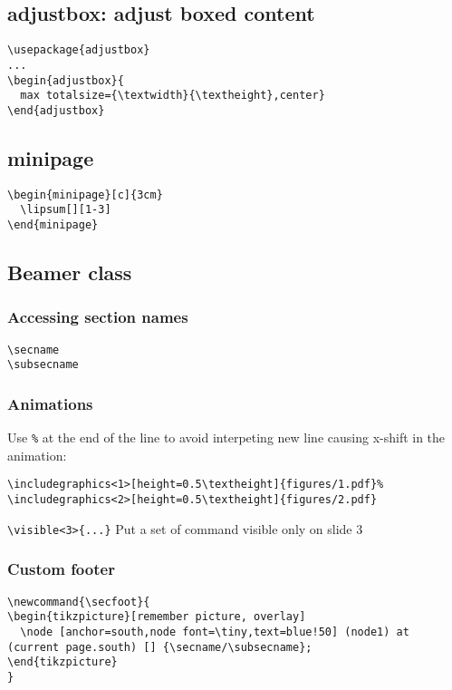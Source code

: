 \subsection{adjustbox: adjust boxed content}
\begin{verbatim}
\usepackage{adjustbox}
...
\begin{adjustbox}{
  max totalsize={\textwidth}{\textheight},center}
\end{adjustbox}
\end{verbatim}

\subsection{minipage}
\begin{minipage}[c]{3cm}
  \lipsum[][1-3]
\end{minipage}
\begin{minipage}[c]{3cm}
  \begin{verbatim}
\begin{minipage}[c]{3cm}
  \lipsum[][1-3]
\end{minipage}
  \end{verbatim}
\end{minipage}

\subsection{Beamer class}
\subsubsection{Accessing section names}
\verb |\secname|\\
\verb |\subsecname|\\
\subsubsection{Animations}
Use \verb|%| at the end of the line to avoid interpeting new line causing x-shift in the animation:
\begin{verbatim}
\includegraphics<1>[height=0.5\textheight]{figures/1.pdf}%
\includegraphics<2>[height=0.5\textheight]{figures/2.pdf}
\end{verbatim}
\verb|\visible<3>{...}| Put a set of command visible only on slide 3
\subsubsection{Custom footer}
\begin{verbatim}
\newcommand{\secfoot}{
\begin{tikzpicture}[remember picture, overlay]
  \node [anchor=south,node font=\tiny,text=blue!50] (node1) at (current page.south) [] {\secname/\subsecname};
\end{tikzpicture}
}
\end{verbatim}

